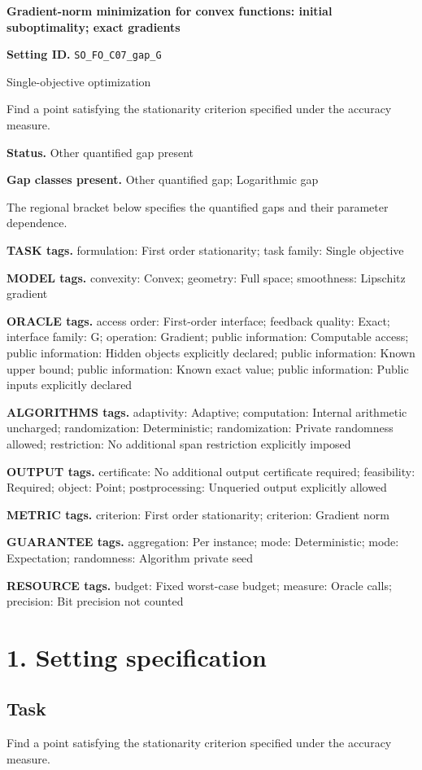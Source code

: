 \documentclass[10pt,a4paper]{article}
\begin{document}
\raggedright

{\LARGE\bfseries\sffamily\color{AtlasNavy} Gradient-norm minimization for convex functions: initial suboptimality; exact gradients\par}\vspace{5pt}
\textbf{Setting ID.} \texttt{SO\_\allowbreak{}FO\_\allowbreak{}C07\_\allowbreak{}gap\_\allowbreak{}G}

Single-objective optimization

Find a point satisfying the stationarity criterion specified under the accuracy measure.

\textbf{Status.} Other quantified gap present

\textbf{Gap classes present.} Other quantified gap; Logarithmic gap

The regional bracket below specifies the quantified gaps and their parameter dependence.

\textbf{TASK tags.} formulation: First order stationarity; task family: Single objective

\textbf{MODEL tags.} convexity: Convex; geometry: Full space; smoothness: Lipschitz gradient

\textbf{ORACLE tags.} access order: First-order interface; feedback quality: Exact; interface family: G; operation: Gradient; public information: Computable access; public information: Hidden objects explicitly declared; public information: Known upper bound; public information: Known exact value; public information: Public inputs explicitly declared

\textbf{ALGORITHMS tags.} adaptivity: Adaptive; computation: Internal arithmetic uncharged; randomization: Deterministic; randomization: Private randomness allowed; restriction: No additional span restriction explicitly imposed

\textbf{OUTPUT tags.} certificate: No additional output certificate required; feasibility: Required; object: Point; postprocessing: Unqueried output explicitly allowed

\textbf{METRIC tags.} criterion: First order stationarity; criterion: Gradient norm

\textbf{GUARANTEE tags.} aggregation: Per instance; mode: Deterministic; mode: Expectation; randomness: Algorithm private seed

\textbf{RESOURCE tags.} budget: Fixed worst-case budget; measure: Oracle calls; precision: Bit precision not counted

\section{1. Setting specification}
\subsection{Task}
Find a point satisfying the stationarity criterion specified under the accuracy measure.
\end{document}
